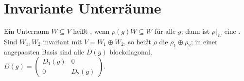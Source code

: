 \section{Invariante Unterräume}

\begin{definition}
Ein Unterraum $W\subseteq V$ heißt , wenn $\rho(g)W\subseteq W$ für alle $g$; dann ist $\rho|_W$ eine . Sind $W_1, W_2$ invariant mit $V = W_1\oplus W_2$, so heißt $\rho$ die  $\rho_1\oplus\rho_2$; in einer angepassten Basis sind alle $D(g)$ blockdiagonal, $D(g) = \begin{pmatrix}D_1(g) & 0\\ 0 & D_2(g)\end{pmatrix}$.
\end{definition}

